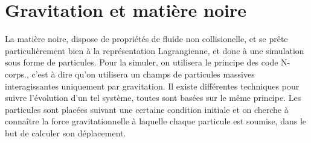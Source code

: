 

%
%

%
%


\section{Gravitation et matière noire}
\label{sec:solverDM}

La matière noire, dispose de propriétés de fluide non collisionelle, et se prête particulièrement bien à la représentation Lagrangienne, et donc à une simulation sous forme de particules.
Pour la simuler, on utilisera le principe des code N-corps., c'est à dire qu'on utilisera un champs de particules massives interagissantes uniquement par gravitation.
Il existe différentes techniques pour suivre l'évolution d'un tel système, toutes sont basées sur le même principe.
Les particules sont placées suivant une certaine condition initiale et on cherche à connaître la force gravitationnelle à laquelle chaque particule est soumise, dans le but de calculer son déplacement.




